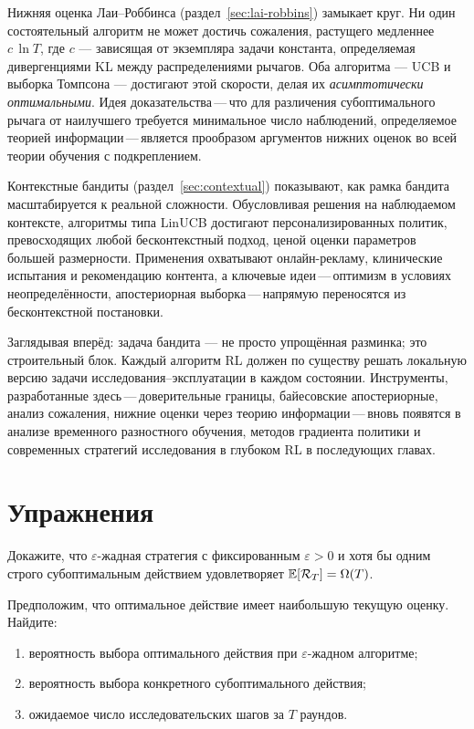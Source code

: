 Нижняя оценка Лаи--Роббинса (раздел~\ref{sec:lai-robbins}) замыкает круг.  Ни один состоятельный алгоритм не может достичь сожаления, растущего медленнее $c\,\ln T$, где $c$ — зависящая от экземпляра задачи константа, определяемая дивергенциями KL между распределениями рычагов.  Оба алгоритма — UCB и выборка Томпсона — достигают этой скорости, делая их \emph{асимптотически оптимальными}.  Идея доказательства\,---\,что для различения субоптимального рычага от наилучшего требуется минимальное число наблюдений, определяемое теорией информации\,---\,является прообразом аргументов нижних оценок во всей теории обучения с подкреплением.

Контекстные бандиты (раздел~\ref{sec:contextual}) показывают, как рамка бандита масштабируется к реальной сложности.  Обусловливая решения на наблюдаемом контексте, алгоритмы типа LinUCB достигают персонализированных политик, превосходящих любой бесконтекстный подход, ценой оценки параметров большей размерности.  Применения охватывают онлайн-рекламу, клинические испытания и рекомендацию контента, а ключевые идеи\,---\,оптимизм в условиях неопределённости, апостериорная выборка\,---\,напрямую переносятся из бесконтекстной постановки.

Заглядывая вперёд: задача бандита — не просто упрощённая разминка; это строительный блок.  Каждый алгоритм RL должен по существу решать локальную версию задачи исследования--эксплуатации в каждом состоянии.  Инструменты, разработанные здесь\,---\,доверительные границы, байесовские апостериорные, анализ сожаления, нижние оценки через теорию информации\,---\,вновь появятся в анализе временного разностного обучения, методов градиента политики и современных стратегий исследования в глубоком RL в последующих главах.


\section*{Упражнения}

\begin{exercise}
Докажите, что $\varepsilon$-жадная стратегия с фиксированным $\varepsilon>0$ и хотя бы одним строго субоптимальным действием удовлетворяет $\operatorname{\mathbb{E}}[\mathcal{R}_T]=\Omega(T)$.
\end{exercise}

\begin{exercise}
Предположим, что оптимальное действие имеет наибольшую текущую оценку.  Найдите:
\begin{enumerate}[label=(\alph*)]
\item вероятность выбора оптимального действия при $\varepsilon$-жадном алгоритме;
\item вероятность выбора конкретного субоптимального действия;
\item ожидаемое число исследовательских шагов за $T$ раундов.
\end{enumerate}
\end{exercise}

